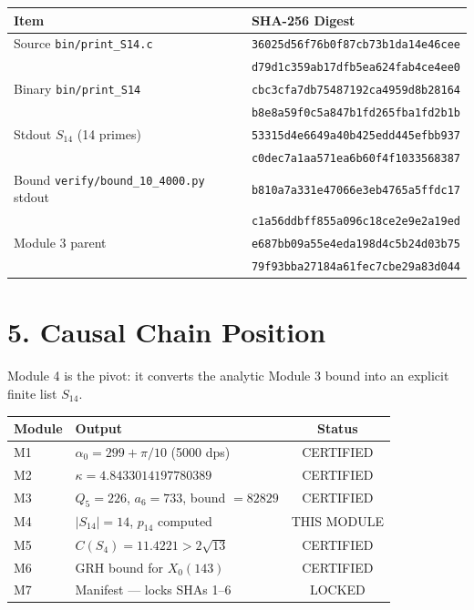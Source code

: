 \documentclass[11pt,letterpaper]{article}
\begin{document}
\begin{center}
\begin{tabular}{|l|l|}
\hline
\textbf{Item} & \textbf{SHA-256 Digest} \\
\hline
Source \texttt{bin/print\_S14.c} & \texttt{36025d56f76b0f87cb73b1da14e46cee} \\
 & \texttt{d79d1c359ab17dfb5ea624fab4ce4ee0} \\
\hline
Binary \texttt{bin/print\_S14} & \texttt{cbc3cfa7db75487192ca4959d8b28164} \\
 & \texttt{b8e8a59f0c5a847b1fd265fba1fd2b1b} \\
\hline
Stdout $S_{14}$ (14 primes) & \texttt{53315d4e6649a40b425edd445efbb937} \\
 & \texttt{c0dec7a1aa571ea6b60f4f1033568387} \\
\hline
Bound \texttt{verify/bound\_10\_4000.py} stdout & \texttt{b810a7a331e47066e3eb4765a5ffdc17} \\
 & \texttt{c1a56ddbff855a096c18ce2e9e2a19ed} \\
\hline
Module 3 parent & \texttt{e687bb09a55e4eda198d4c5b24d03b75} \\
 & \texttt{79f93bba27184a61fec7cbe29a83d044} \\
\hline
\end{tabular}
\end{center}

\section*{5. Causal Chain Position}

Module 4 is the pivot: it converts the analytic Module 3 bound into an
explicit finite list $S_{14}$.

\begin{center}
\begin{tabular}{|l|l|c|}
\hline
\textbf{Module} & \textbf{Output} & \textbf{Status} \\
\hline
M1 & $\alpha_0 = 299 + \pi/10$ (5000 dps) & \textcolor{certgreen}{CERTIFIED} \\
M2 & $\kappa = 4.8433014197780389$ & \textcolor{certgreen}{CERTIFIED} \\
M3 & $Q_5=226$, $a_6=733$, bound $=82829$ & \textcolor{certgreen}{CERTIFIED} \\
M4 & $|S_{14}|=14$, $p_{14}$ computed & \textcolor{certgreen}{THIS MODULE} \\
M5 & $C(S_4) = 11.4221 > 2\sqrt{13}$ & \textcolor{certgreen}{CERTIFIED} \\
M6 & GRH bound for $X_0(143)$ & \textcolor{certgreen}{CERTIFIED} \\
M7 & Manifest --- locks SHAs 1--6 & \textcolor{certgreen}{LOCKED} \\
\hline
\end{tabular}
\end{center}
\end{document}
